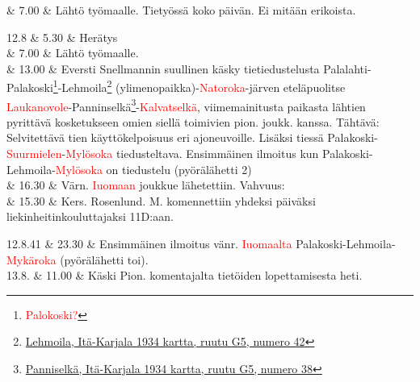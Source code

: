 \documentclass[11pt,a5paper,oneside]{book}
\begin{document}
& 7.00 & Lähtö työmaalle. \newline Tietyössä koko päivän. \newline Ei mitään erikoista. \\

\taulustop


12.8 & 5.30 & Herätys \\

& 7.00 & Lähtö työmaalle. \\

& 13.00 & Eversti Snellmannin suullinen käsky tietiedustelusta Palalahti-Palakoski\footnote{\textcolor{red}{Palokoski?}}-Lehmoila\footnote{\href{https://www.google.fi/maps/place/61\%C2\%B021'43.9\%22N+32\%C2\%B029'59.3\%22E/}{Lehmoila, Itä-Karjala 1934 kartta, ruutu G5, numero 42}} (ylimenopaikka)-\textcolor{red}{Natoroka}-järven eteläpuolitse \textcolor{red}{Laukanovole}-Panninselkä\footnote{\href{https://www.google.fi/maps/place/61\%C2\%B023'52.2\%22N+32\%C2\%B046'25.9\%22E/@61.397831,32.7716833,901m/}{Panniselkä, Itä-Karjala 1934 kartta, ruutu G5, numero 38}}-\textcolor{red}{Kalvatselkä}, viimemainitusta paikasta lähtien pyrittävä kosketukseen omien siellä toimivien pion. joukk. kanssa. Tähtävä: Selvitettävä tien käyttökelpoisuus eri ajoneuvoille. Lisäksi tiessä Palakoski-\textcolor{red}{Suurmielen}-\textcolor{red}{Mylösoka} tiedusteltava. \newline Ensimmäinen ilmoitus kun Palakoski-Lehmoila-\textcolor{red}{Mylösoka} on tiedustelu (pyörälähetti 2) \\

& 16.30 & Värn. \textcolor{red}{Iuomaan} joukkue lähetettiin. Vahvuus: \newline \\

& 15.30 & Kers. Rosenlund. M. komennettiin yhdeksi päiväksi liekinheitinkouluttajaksi 11D:aan. \\
\newpage

12.8.41 & 23.30 & Ensimmäinen ilmoitus vänr. \textcolor{red}{Iuomaalta} Palakoski-Lehmoila-\textcolor{red}{Mykäroka} (pyörälähetti toi). \newline\newline\newline\newline\newline \\

13.8. & 11.00 & Käski Pion. komentajalta tietöiden lopettamisesta heti. \newline \\
\end{document}
